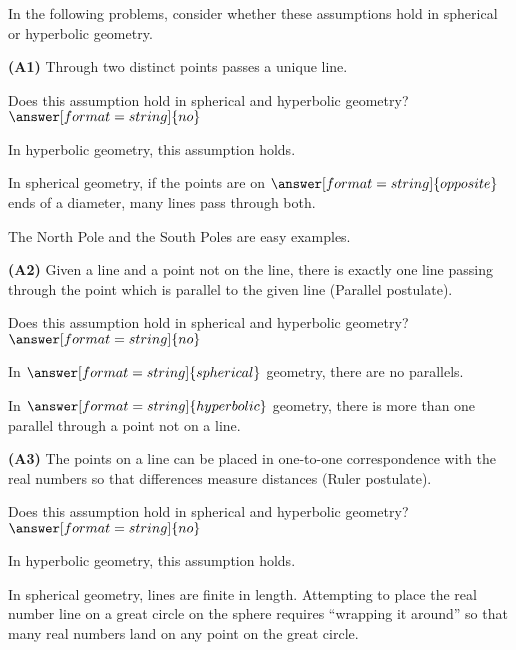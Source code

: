 \documentclass[nooutcomes]{ximera}
\begin{document}
In the following problems, consider whether these assumptions hold in spherical or hyperbolic geometry. 



\begin{problem}
\textbf{(A1)} Through two distinct points passes a unique line.

Does this assumption hold in spherical and hyperbolic geometry? 
$\answer[format=string]{no}$

\begin{problem}
In hyperbolic geometry, this assumption holds. 

In spherical geometry, if the points are on $\answer[format=string]{opposite}$ ends of a diameter, many lines pass through both.
\begin{feedback}
The North Pole and the South Poles are easy examples.  
\end{feedback}
\end{problem}
\end{problem}

\begin{problem}
\textbf{(A2)} Given a line and a point not on the line, there is exactly one line passing through the point which is parallel to the given line (Parallel postulate).

Does this assumption hold in spherical and hyperbolic geometry? 
$\answer[format=string]{no}$
\begin{problem}
In $\answer[format=string]{spherical}$ geometry, there are no parallels. 

In $\answer[format=string]{hyperbolic}$ geometry, there is more than one parallel through a point not on a line. 
\end{problem}
\end{problem}

\begin{problem}
\textbf{(A3)} The points on a line can be placed in one-to-one correspondence with the real numbers so that differences measure distances (Ruler postulate).  

Does this assumption hold in spherical and hyperbolic geometry? 
$\answer[format=string]{no}$

\begin{problem}
In hyperbolic geometry, this assumption holds. 

In spherical geometry, lines are finite in length.  Attempting to place the real number line on a great circle on the sphere requires ``wrapping it around'' so that many real numbers land on any point on the great circle.  
\end{problem}
\end{problem}
\end{document}
